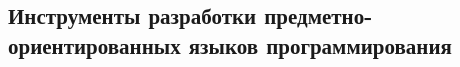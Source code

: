 \subsection{Инструменты разработки предметно-ориентированных языков программирования} \label{sub122}